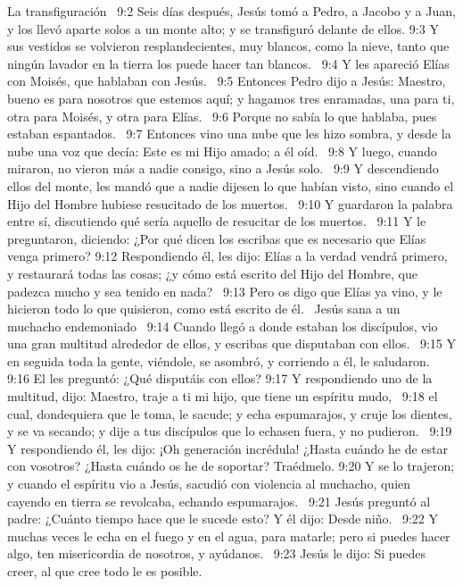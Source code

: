 La transfiguración   
9:2 Seis días después, Jesús tomó a Pedro, a Jacobo y a Juan, y los llevó aparte solos a un monte alto; y se transfiguró delante de ellos. 
9:3 Y sus vestidos se volvieron resplandecientes, muy blancos, como la nieve, tanto que ningún lavador en la tierra los puede hacer tan blancos.  
9:4 Y les apareció Elías con Moisés, que hablaban con Jesús.  
9:5 Entonces Pedro dijo a Jesús: Maestro, bueno es para nosotros que estemos aquí; y hagamos tres enramadas, una para ti, otra para Moisés, y otra para Elías.  
9:6 Porque no sabía lo que hablaba, pues estaban espantados.  
9:7 Entonces vino una nube que les hizo sombra, y desde la nube una voz que decía: Este es mi Hijo amado; a él oíd.  
9:8 Y luego, cuando miraron, no vieron más a nadie consigo, sino a Jesús solo.  
9:9 Y descendiendo ellos del monte, les mandó que a nadie dijesen lo que habían visto, sino cuando el Hijo del Hombre hubiese resucitado de los muertos.  
9:10 Y guardaron la palabra entre sí, discutiendo qué sería aquello de resucitar de los muertos.  
9:11 Y le preguntaron, diciendo: ¿Por qué dicen los escribas que es necesario que Elías venga primero? 
9:12 Respondiendo él, les dijo: Elías a la verdad vendrá primero, y restaurará todas las cosas; ¿y cómo está escrito del Hijo del Hombre, que padezca mucho y sea tenido en nada?  
9:13 Pero os digo que Elías ya vino, y le hicieron todo lo que quisieron, como está escrito de él.  
Jesús sana a un muchacho endemoniado   
9:14 Cuando llegó a donde estaban los discípulos, vio una gran multitud alrededor de ellos, y escribas que disputaban con ellos.  
9:15 Y en seguida toda la gente, viéndole, se asombró, y corriendo a él, le saludaron.  
9:16 El les preguntó: ¿Qué disputáis con ellos? 
9:17 Y respondiendo uno de la multitud, dijo: Maestro, traje a ti mi hijo, que tiene un espíritu mudo,  
9:18 el cual, dondequiera que le toma, le sacude; y echa espumarajos, y cruje los dientes, y se va secando; y dije a tus discípulos que lo echasen fuera, y no pudieron.  
9:19 Y respondiendo él, les dijo: ¡Oh generación incrédula! ¿Hasta cuándo he de estar con vosotros? ¿Hasta cuándo os he de soportar? Traédmelo. 
9:20 Y se lo trajeron; y cuando el espíritu vio a Jesús, sacudió con violencia al muchacho, quien cayendo en tierra se revolcaba, echando espumarajos.  
9:21 Jesús preguntó al padre: ¿Cuánto tiempo hace que le sucede esto? Y él dijo: Desde niño.  
9:22 Y muchas veces le echa en el fuego y en el agua, para matarle; pero si puedes hacer algo, ten misericordia de nosotros, y ayúdanos.  
9:23 Jesús le dijo: Si puedes creer, al que cree todo le es posible.  
